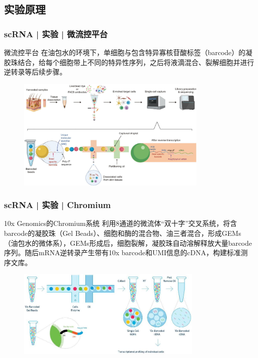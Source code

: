 \documentclass[11pt]{ctexbeamer}
\begin{document}
\subsection{实验原理}
\begin{frame}
  \frametitle{scRNA | 实验 | 微流控平台}
  \begin{block}{微流控平台}
  在油包水的环境下，单细胞与包含特异寡核苷酸标签（barcode）的凝胶珠结合，给每个细胞带上不同的特异性序列，之后将液滴混合、裂解细胞并进行逆转录等后续步骤。
  \end{block}
  \vspace{-0.3em}
       \begin{figure}
    \centering
    \includegraphics[width=0.82\textwidth]{scRNA_tech_01.png}
  \end{figure}
\end{frame}

\begin{frame}
  \frametitle{scRNA | 实验 | Chromium}
    \begin{block}{10x Genomics的Chromium系统}
    利用8通道的微流体“双十字”交叉系统，将含barcode的凝胶珠（Gel Beads）、细胞和酶的混合物、油三者混合，形成GEMs（油包水的微体系），GEMs形成后，细胞裂解，凝胶珠自动溶解释放大量barcode序列。随后mRNA逆转录产生带有10x barcode和UMI信息的cDNA，构建标准测序文库。
  \end{block}
  \vspace{-0.3em}
       \begin{figure}
    \centering
    \includegraphics[width=0.8\textwidth]{scRNA_tech_02.png}
  \end{figure}
\end{frame}
\end{document}
